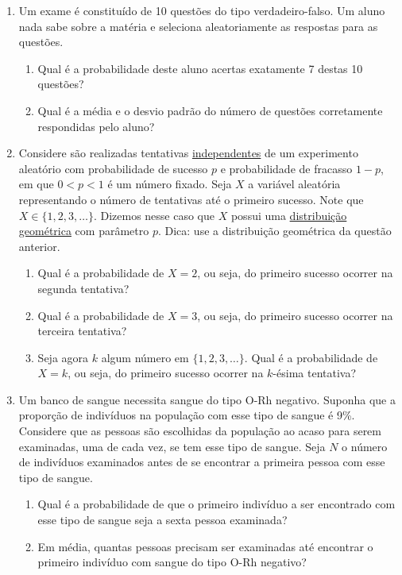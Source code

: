 \documentclass{article}
\begin{document}
\begin{enumerate}
	\item Um exame é constituído de 10 questões do tipo verdadeiro-falso. Um aluno nada sabe sobre a matéria e seleciona aleatoriamente as respostas para as questões.
	\begin{enumerate}
		\item Qual é a probabilidade deste aluno acertas exatamente 7 destas 10 questões?
		
		\item Qual é a média e o desvio padrão do número de questões corretamente respondidas pelo aluno?
	\end{enumerate}	    
    
    
    \item Considere são realizadas tentativas \underline{independentes} de um experimento aleatório com probabilidade de sucesso $p$ e probabilidade de fracasso $1-p$, em que $0<p<1$ é um número fixado. Seja $X$ a variável aleatória representando o número de tentativas até o primeiro sucesso. Note que $X\in\{1,2,3,\ldots\}$. Dizemos nesse caso que $X$ possui uma \underline{distribuição geométrica} com parâmetro $p$. Dica: use a distribuição geométrica da questão anterior.
    \begin{enumerate}
    	\item Qual é a probabilidade de $X=2$, ou seja, do primeiro sucesso ocorrer na segunda tentativa?
    	\item Qual é a probabilidade de $X=3$, ou seja, do primeiro sucesso ocorrer na terceira tentativa?
    	\item Seja agora $k$ algum número em $\{1,2,3, \ldots\}$. Qual é a probabilidade de $X=k$, ou seja, do primeiro sucesso ocorrer na $k$-ésima tentativa?
    \end{enumerate}
    
    
    
    \item Um banco de sangue necessita sangue do tipo O-Rh negativo. Suponha que a proporção de indivíduos na população com esse tipo de sangue é 9\%. Considere que as pessoas são escolhidas da população ao acaso para serem examinadas, uma de cada vez, se tem esse tipo de sangue. Seja $N$ o número de indivíduos examinados antes de se encontrar a primeira pessoa com esse tipo de sangue.
    \begin{enumerate}
    	\item Qual é a probabilidade de que o primeiro indivíduo a ser encontrado com esse tipo de sangue seja a sexta pessoa examinada?
    	\item Em média, quantas pessoas precisam ser examinadas até encontrar o primeiro indivíduo com sangue do tipo O-Rh negativo?
    \end{enumerate}
    

\end{enumerate}
\end{document}
